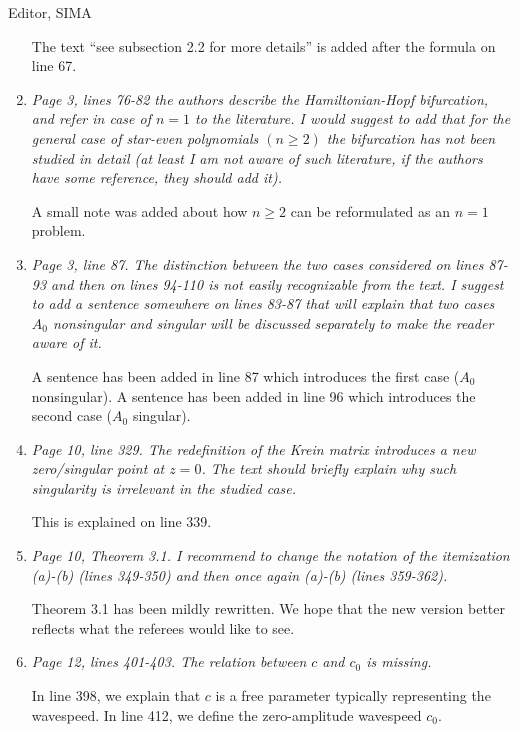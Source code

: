 \documentclass[11pt]{letter}
\begin{document}
\begin{letter}{Editor, SIMA}
\begin{enumerate}
The text ``see subsection 2.2 for more details'' is added after the formula on line 67.

\item \emph{Page 3, lines 76-82 the authors describe the Hamiltonian-Hopf bifurcation, and refer in case of $n = 1$ to the literature. I would suggest to add that for the general case of star-even polynomials $(n \geq 2)$ the bifurcation has not been studied in detail (at least I am not aware of such literature, if the authors have some reference, they should add it).}
\vspace{4mm}

A small note was added about how $n\ge2$ can be reformulated as an $n=1$ problem.

\item \emph{Page 3, line 87. The distinction between the two cases considered on lines 87-93 and then on lines 94-110 is not easily recognizable from the text. I suggest to add a sentence somewhere on lines 83-87 that will explain that two cases $A_0$ nonsingular and singular will be discussed separately to make the reader aware of it.}
\vspace{4mm}

A sentence has been added in line 87 which introduces the first case ($A_0$ nonsingular). A sentence has been added in line 96 which introduces the second case ($A_0$ singular).

\item \emph{Page 10, line 329. The redefinition of the Krein matrix introduces a new zero/singular point at $z = 0$. The text should briefly explain why such singularity is irrelevant in the studied case.}
\vspace{4mm}

This is explained on line 339.

\item \emph{Page 10, Theorem 3.1. I recommend to change the notation of the itemization (a)-(b) (lines 349-350) and then once again (a)-(b) (lines 359-362).}
\vspace{4mm}

Theorem 3.1 has been mildly rewritten.  We hope that the new version better reflects what the referees would like to see.

\item \emph{Page 12, lines 401-403. The relation between $c$ and $c_0$ is missing.}
\vspace{4mm}

In line 398, we explain that $c$ is a free parameter typically representing the wavespeed. In line 412, we define the zero-amplitude wavespeed $c_0$.


\end{enumerate}
\end{letter}
\end{document}
